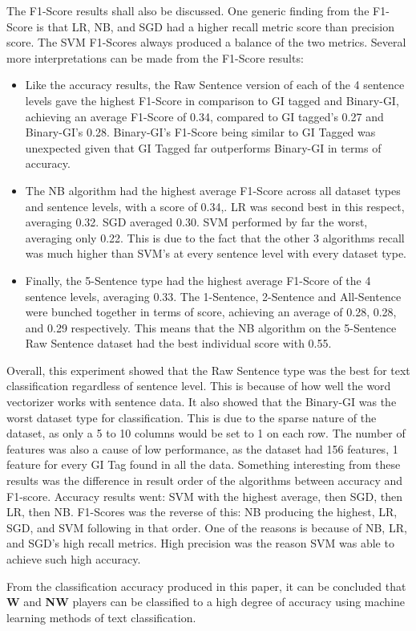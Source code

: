 \documentclass[oneside,12pt]{Classes/RoboticsLaTeX}
\begin{document}
The F1-Score results shall also be discussed. One generic finding from the F1-Score is that LR, NB, and SGD had a higher recall metric score than precision score. The SVM F1-Scores always produced a balance of the two metrics. 
Several more interpretations can be made from the F1-Score results:
\begin{itemize}
  \item Like the accuracy results, the Raw Sentence version of each of the 4 sentence levels gave the highest F1-Score in comparison to GI tagged and Binary-GI, achieving an average F1-Score of 0.34, compared to GI tagged's 0.27 
         and Binary-GI's 0.28. Binary-GI's F1-Score being similar to GI Tagged was unexpected given that GI Tagged far outperforms Binary-GI in terms of accuracy.
  \item The NB algorithm had the highest average F1-Score across all dataset types and sentence levels, with a score of 0.34,. LR was second best in this respect,
        averaging 0.32. SGD averaged 0.30. SVM performed by far the worst, averaging only 0.22. This is due to the fact that the other 3 algorithms recall was much higher than SVM's at every sentence level with every dataset type.
  \item Finally, the 5-Sentence type had the highest average F1-Score of the 4 sentence levels, averaging 0.33. The 1-Sentence, 2-Sentence and All-Sentence were bunched together in terms of score, achieving an average of 0.28, 0.28, and
        0.29 respectively. This means that the NB algorithm on the 5-Sentence Raw Sentence dataset had the best individual score with 0.55.
\end{itemize}

Overall, this experiment showed that the Raw Sentence type was the best for text classification regardless of sentence level. This is because of how well the word vectorizer works with sentence data. It also showed that the Binary-GI was the worst
dataset type for classification. This is due to the sparse nature of the dataset, as only a 5 to 10 columns would be set to 1 on each row. The number of features was also a cause of low performance, as the dataset had 156 features, 1 feature for every 
GI Tag found in all the data. Something interesting from these results was the difference in result order of the algorithms between accuracy and F1-score. Accuracy results went: SVM with the highest average, then SGD, then LR, then NB. F1-Scores was the 
reverse of this: NB producing the highest, LR, SGD, and SVM following in that order. One of the reasons is because of NB, LR, and SGD's high recall metrics. High precision was the reason SVM was able to achieve such high accuracy. \par
From the classification accuracy produced in this paper, it can be concluded that \textbf{W} and \textbf{NW} players can be classified to a high degree of accuracy using machine learning methods of text classification. 
\pagebreak
\end{document}
